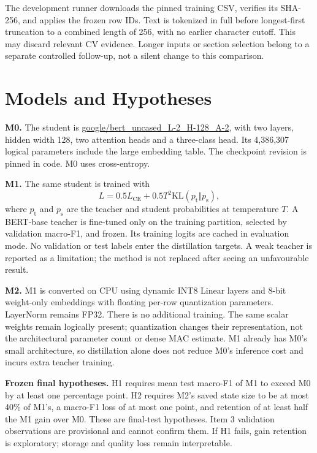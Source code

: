 \documentclass[11pt]{article}
\begin{document}
The development runner downloads the pinned training CSV, verifies its SHA-256, and applies the frozen row IDs. Text is tokenized in full before longest-first truncation to a combined length of 256, with no earlier character cutoff. This may discard relevant CV evidence. Longer inputs or section selection belong to a separate controlled follow-up, not a silent change to this comparison.

\section{Models and Hypotheses}
\textbf{M0.} The student is \url{google/bert_uncased_L-2_H-128_A-2}, with two layers, hidden width 128, two attention heads and a three-class head. Its 4,386,307 logical parameters include the large embedding table. The checkpoint revision is pinned in code. M0 uses cross-entropy.

\textbf{M1.} The same student is trained with
\begin{equation}
L=0.5L_{\mathrm{CE}}+0.5T^2\mathrm{KL}(p_{\mathrm{t}}\Vert p_{\mathrm{s}}),
\end{equation}
where $p_{\mathrm{t}}$ and $p_{\mathrm{s}}$ are the teacher and student probabilities at temperature $T$. A BERT-base teacher is fine-tuned only on the training partition, selected by validation macro-F1, and frozen. Its training logits are cached in evaluation mode. No validation or test labels enter the distillation targets. A weak teacher is reported as a limitation; the method is not replaced after seeing an unfavourable result.

\textbf{M2.} M1 is converted on CPU using dynamic INT8 Linear layers and 8-bit weight-only embeddings with floating per-row quantization parameters. LayerNorm remains FP32. There is no additional training. The same scalar weights remain logically present; quantization changes their representation, not the architectural parameter count or dense MAC estimate. M1 already has M0's small architecture, so distillation alone does not reduce M0's inference cost and incurs extra teacher training.

\textbf{Frozen final hypotheses.} H1 requires mean test macro-F1 of M1 to exceed M0 by at least one percentage point. H2 requires M2's saved state size to be at most 40\% of M1's, a macro-F1 loss of at most one point, and retention of at least half the M1 gain over M0. These are final-test hypotheses. Item 3 validation observations are provisional and cannot confirm them. If H1 fails, gain retention is exploratory; storage and quality loss remain interpretable.
\end{document}
